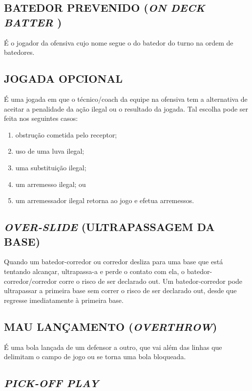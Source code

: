 \subsection{BATEDOR PREVENIDO (\textit{ON DECK BATTER} )}
 É o jogador da ofensiva cujo nome segue o do batedor do turno na ordem de
 batedores.

\subsection{JOGADA OPCIONAL}
 É uma jogada em que o técnico/\gls{coach} da equipe na ofensiva tem a alternativa de aceitar a penalidade da ação ilegal ou o resultado da jogada. Tal escolha pode  ser feita nos seguintes casos:

	\begin{enumerate}[label= \roman*.]
	\item obstrução cometida pelo receptor;
	\item uso de uma luva ilegal;
	\item uma substituição ilegal;
	\item um arremesso ilegal; ou
	\item um arremessador ilegal retorna ao jogo e efetua arremessos.
	\end{enumerate}

\subsection{\textit{OVER-SLIDE} (ULTRAPASSAGEM DA BASE)}

 Quando um batedor-corredor ou corredor desliza para uma base que está tentando alcançar, ultrapassa-a e perde o contato com ela, o batedor-corredor/corredor corre o risco de ser declarado \gls{out}. Um batedor-corredor pode ultrapassar a primeira base sem correr o risco de ser declarado \gls{out}, desde que regresse imediatamente à primeira base.

\subsection{MAU LANÇAMENTO (\textit{OVERTHROW})}

É uma bola lançada de um defensor a outro, que vai além das linhas que  delimitam o campo de jogo ou se torna uma bola bloqueada.

\subsection{\textit{PICK-OFF PLAY}}

